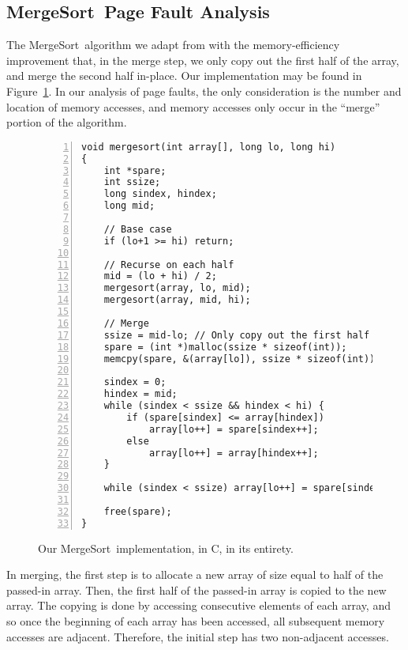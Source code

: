 \documentclass{acmtrans2m}
\newcommand{\mergesort}{{\sc MergeSort}}
\begin{document}
\subsection{\mergesort\ Page Fault Analysis} 

The \mergesort\ algorithm we adapt from  with the memory-efficiency
improvement that, in the merge step, we only copy out the first half of the
array, and merge the second half in-place.  Our implementation may be found in
Figure~\ref{fig:msort}.  In our analysis of page faults, the only consideration
is the number and location of memory accesses, and memory accesses only occur
in the ``merge'' portion of the algorithm.

\begin{figure}
{\footnotesize
\begin{Verbatim}[numbers=left,numbersep=3pt,xleftmargin=20pt]
void mergesort(int array[], long lo, long hi)
{
    int *spare;
    int ssize;
    long sindex, hindex;
    long mid;

    // Base case
    if (lo+1 >= hi) return; 

    // Recurse on each half
    mid = (lo + hi) / 2;  
    mergesort(array, lo, mid);
    mergesort(array, mid, hi);

    // Merge
    ssize = mid-lo; // Only copy out the first half
    spare = (int *)malloc(ssize * sizeof(int));
    memcpy(spare, &(array[lo]), ssize * sizeof(int));

    sindex = 0;
    hindex = mid;
    while (sindex < ssize && hindex < hi) {
        if (spare[sindex] <= array[hindex])
            array[lo++] = spare[sindex++];
        else
            array[lo++] = array[hindex++];
    }

    while (sindex < ssize) array[lo++] = spare[sindex++];

    free(spare);
}
\end{Verbatim}
}

\caption{Our \mergesort\ implementation, in C, in its entirety.}
\label{fig:msort}
\end{figure}

In merging, the first step is to allocate a new array of size equal to half of
the passed-in array.  Then, the first half of the passed-in array is copied to
the new array.  The copying is done by accessing consecutive elements of each
array, and so once the beginning of each array has been accessed, all
subsequent memory accesses are adjacent.  Therefore, the initial step has two
non-adjacent accesses.
\end{document}
